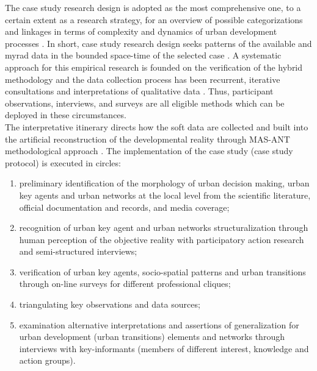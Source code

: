 \documentclass[11pt]{report}
\begin{document}
The case study research design is adopted as the most comprehensive one, to a certain extent as a research strategy, for an overview of possible categorizations and linkages in terms of complexity and dynamics of urban development processes . In short, case study research design seeks patterns of the available and myrad data in the bounded space-time of the selected case . A systematic approach for this empirical research is founded on the verification of the hybrid methodology and the data collection process has been recurrent, iterative consultations and interpretations of qualitative data . Thus, participant observations, interviews,  and surveys are all eligible methods which can be deployed in these circumstances.
\\
The interpretative itinerary directs how the soft data are collected and built into the artificial reconstruction of the developmental reality through MAS-ANT methodological approach . The implementation of the case study (case study protocol) is executed in circles:
\begin{enumerate}
\item preliminary identification of the morphology of urban decision making, urban key agents and urban networks at the local level from the scientific literature, official documentation and records, and media coverage;
\item recognition of  urban key agent and urban networks structuralization through human perception of the objective reality with participatory action research and semi-structured interviews;
\item verification of urban key agents, socio-spatial patterns and urban transitions through on-line surveys for different professional cliques;
\item triangulating key observations and data sources;
\item examination  alternative interpretations and assertions of generalization for urban development (urban transitions) elements and networks through interviews with  key-informants (members of different interest, knowledge and action groups).
\end{enumerate}
\end{document}
